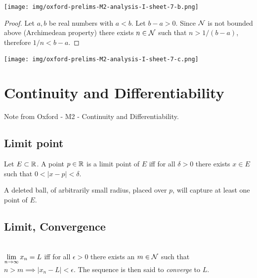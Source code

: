 \begin{enumerate}
  \begin{mdframed}
    \texttt{[image: img/oxford-prelims-M2-analysis-I-sheet-7-b.png]}
  \end{mdframed}

  \begin{proof}
    Let $a, b$ be real numbers with $a < b$. Let $b - a > 0$. Since $\N$ is not bounded above
    (Archimedean property) there exists $n \in \N$ such that $n > 1/(b - a)$, therefore
    $1/n < b - a$.
  \end{proof}

  \begin{mdframed}
    \texttt{[image: img/oxford-prelims-M2-analysis-I-sheet-7-c.png]}
  \end{mdframed}

\end{enumerate}


\newpage

\section{Continuity and Differentiability}
Note from Oxford - M2 - Continuity and Differentiability.

\subsection{Limit point}
\begin{definition*}
Let $E \subset \R$. A point $p \in \R$ is a limit point of $E$ iff for all $\delta > 0$ there
exists $x \in E$ such that $0 < |x - p| < \delta$.
\end{definition*}
\begin{intuition*}
  A deleted ball, of arbitrarily small radius, placed over $p$, will capture at least one point of
  $E$.
\end{intuition*}

\subsection{Limit, Convergence}

\begin{definition*}~\\
$\LimEq{x_n}{L}{n}{\infty}$ iff for all $\epsilon > 0$ there exists an $m \in \N$ such that
$n > m \implies |x_n - L| < \epsilon$. The sequence is then said to \textit{converge} to $L$.
\end{definition*}

